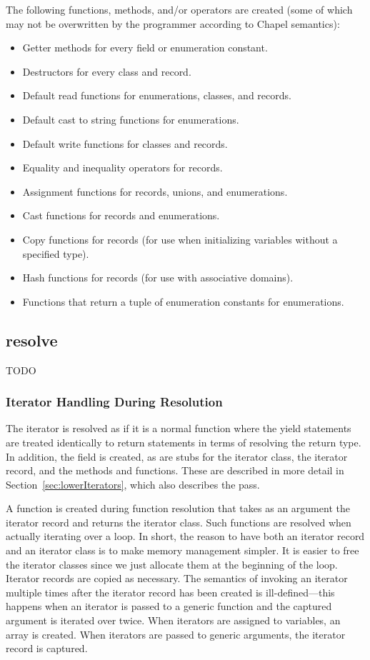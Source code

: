 \documentclass[10pt]{article}
\begin{document}
The following functions, methods, and/or operators are created (some
of which may not be overwritten by the programmer according to Chapel
semantics):
\begin{itemize}
\item Getter methods for every field or enumeration constant.
\item Destructors for every class and record.
\item Default read functions for enumerations, classes, and records.
\item Default cast to string functions for enumerations.
\item Default write functions for classes and records.
\item Equality and inequality operators for records.
\item Assignment functions for records, unions, and enumerations.
\item Cast functions for records and enumerations.
\item Copy functions for records (for use when initializing variables
  without a specified type).
\item Hash functions for records (for use with associative domains).
\item Functions that return a tuple of enumeration constants for
  enumerations.
\end{itemize}

\subsection{resolve}

TODO

\subsubsection{Iterator Handling During Resolution}

The iterator is resolved as if it is a normal function where the yield
statements are treated identically to return statements in terms of
resolving the return type.  In addition, the  field
is created, as are stubs for the iterator class, the iterator record,
and the methods and functions.  These are described in more detail in
Section~\ref{sec:lowerIterators}, which also describes the
 pass.

A function  is created during function resolution
that takes as an argument the iterator record and returns the iterator
class.  Such functions are resolved when actually iterating over a
loop.  In short, the reason to have both an iterator record and an
iterator class is to make memory management simpler.  It is easier to
free the iterator classes since we just allocate them at the beginning
of the loop.  Iterator records are copied as necessary.  The semantics
of invoking an iterator multiple times after the iterator record has
been created is ill-defined---this happens when an iterator is passed
to a generic function and the captured argument is iterated over
twice.  When iterators are assigned to variables, an array is created.
When iterators are passed to generic arguments, the iterator record is
captured.
\end{document}
